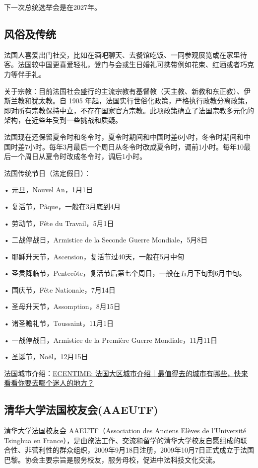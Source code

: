 下一次总统选举会是在2027年。

\subsection{风俗及传统}
法国人喜爱出门社交，比如在酒吧聊天、去餐馆吃饭、一同参观展览或在家里待客。法国较中国更喜爱轻礼，登门与会或生日婚礼可携带例如花束、红酒或者巧克力等伴手礼。

关于宗教：目前法国社会盛行的主流宗教有基督教（天主教、新教和东正教）、伊斯兰教和犹太教。自 1905 年起，法国实行世俗化政策，严格执行政教分离政策，即对所有宗教保持中立，不存在国家官方宗教。此项政策确立了法国宗教多元化的架构，在近些年受到一些挑战和质疑。

法国现在还保留夏令时和冬令时，夏令时期间和中国时差6小时，冬令时期间和中国时差7小时。每年3月最后一个周日从冬令时改成夏令时，调前1小时。每年10最后一个周日从夏令时改成冬令时，调后1小时。

法国传统节日（法定假日）：

• 元旦，Nouvel An，1月1日

• 复活节，Pâque，一般在3月底到4月

• 劳动节，Fête du Travail，5月1日

• 二战停战日，Armistice de la Seconde Guerre Mondiale，5月8日

• 耶稣升天节，Ascension，复活节过40天，一般在5月中旬

• 圣灵降临节，Pentecôte，复活节后第七个周日，一般在五月下旬到6月中旬。

• 国庆节，Fête Nationale，7月14日

• 圣母升天节，Assomption，8月15日

• 诸圣瞻礼节，Toussaint，11月1日

• 一战停战日，Armistice de la Première Guerre Mondiale，11月11日

• 圣诞节，Noël，12月15日

法国城市介绍：\href{https://www.ecentime.com/article/-france-geographie}{ECENTIME: 法国大区城市介绍｜最值得去的城市有哪些，快来看看你要去哪个迷人的地方？} 

\subsection{清华大学法国校友会(AAEUTF)}

清华大学法国校友会 AAEUTF（Association des Anciens Elèves de l’Université Tsinghua en France），是由旅法工作、交流和留学的清华大学校友自愿组成的联合性、非营利性的群众组织，2009年9月18日注册，2009年10月7日正式成立于法国巴黎。协会主要宗旨是服务校友，服务母校，促进中法科技文化交流。

